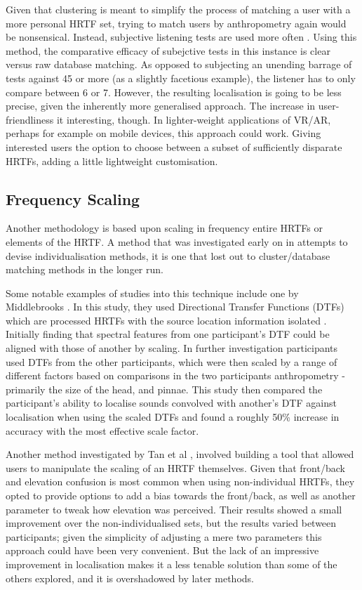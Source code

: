 Given that clustering is meant to simplify the process of matching a user with a more personal HRTF set, trying to match users by anthropometry again would be nonsensical. Instead, subjective listening tests are used more often \citep{xie2013a}. Using this method, the comparative efficacy of subejctive tests in this instance is clear versus raw database matching. As opposed to subjecting an unending barrage of tests against 45 or more (as a slightly facetious example), the listener has to only compare between 6 or 7. However, the resulting localisation is going to be less precise, given the inherently more generalised approach. The increase in user-friendliness it interesting, though. In lighter-weight applications of VR/AR, perhaps for example on mobile devices, this approach could work. Giving interested users the option to choose between a subset of sufficiently disparate HRTFs, adding a little lightweight customisation.

\subsection{Frequency Scaling}
Another methodology is based upon scaling in frequency entire HRTFs or elements of the HRTF. A method that was investigated early on in attempts to devise individualisation methods, it is one that lost out to cluster/database matching methods in the longer run.

Some notable examples of studies into this technique include one by Middlebrooks \citep{Middlebrooks1999}. In this study, they used Directional Transfer Functions (DTFs) which are processed HRTFs with the source location information isolated \citep{middlebrooks1990}. Initially finding that spectral features from one participant's DTF could be aligned with those of another by scaling. In further investigation participants used DTFs from the other participants, which were then scaled by a range of different factors based on comparisons in the two participants anthropometry - primarily the size of the head, and pinnae. This study then compared the participant's ability to localise sounds convolved with another's DTF against localisation when using the scaled DTFs and found a roughly 50\% increase in accuracy with the most effective scale factor. 

Another method investigated by Tan et al \citep{Tan1998}, involved building a tool that allowed users to manipulate the scaling of an HRTF themselves. Given that front/back and elevation confusion is most common when using non-individual HRTFs, they opted to provide options to add a bias towards the front/back, as well as another parameter to tweak how elevation was perceived. Their results showed a small improvement over the non-individualised sets, but the results varied between participants; given the simplicity of adjusting a mere two parameters this approach could have been very convenient. But the lack of an impressive improvement in localisation makes it a less tenable solution than some of the others explored, and it is overshadowed by later methods. 


